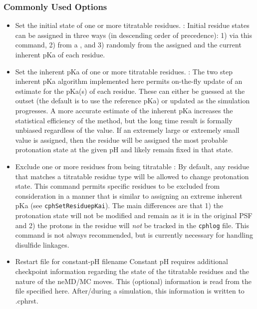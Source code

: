 \subsubsection{Commonly Used Options}
\begin{itemize}
\item {}
{Set the initial state of one or more titratable residues.}
{
:  
}
{
Initial residue states can be assigned in three ways (in descending order of 
  precedence): 1) via this command, 2) from a , and 3)
  randomly from the assigned  and the current inherent pKa of each
  residue.
}

\item {}
{Set the inherent pKa of one or more titratable residues.}
{
:  
}
{
The two step inherent pKa algorithm implemented here permits on-the-fly update
  of an estimate for the pKa(s) of each residue.
These can either be guessed at the outset (the default is to use the reference
  pKa) or updated as the simulation progresses.
A more accurate estimate of the inherent pKa increases the statistical
  efficiency of the method, but the long time result is formally unbiased
  regardless of the value.
If an extremely large or extremely small value is assigned, then the residue
  will be assigned the most probable protonation state at the given pH and
  likely remain fixed in that state.
}

\item {}
{Exclude one or more residues from being titratable}
{
: 
}
{
By default, any residue that matches a titratable residue type will be allowed
  to change protonation state.
This command permits specific residues to be excluded from consideration in a
  manner that is similar to assigning an extreme inherent pKa (see
  \texttt{cphSetResiduepKai}).
The main differences are that 1) the protonation state will not be modified and
  remain as it is in the original PSF and 2) the protons in the residue will
  \emph{not} be tracked in the \texttt{cphlog} file.
This command is not always recommended, but is currently necessary for handling
  disulfide linkages.
}

\item {}
{Restart file for constant-pH}
{filename}
{
Constant pH requires additional checkpoint information regarding the state of
  the titratable residues and the nature of the neMD/MC moves.
This (optional) information is read from the file specified here.
After/during a simulation, this information is written to 
  \KEY{[outputname]}.cphrst.
}


\end{itemize}
